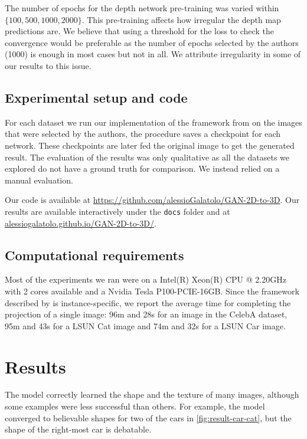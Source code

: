 The number of epochs for the depth network pre-training was varied within $\{100,\allowbreak 500,\allowbreak 1000,\allowbreak 2000\}$. This pre-training affects how irregular the depth map predictions are. We believe that using a threshold for the loss to check the convergence would be preferable as the number of epochs selected by the authors (1000) is enough in most cases but not in all. We attribute irregularity in some of our results to this issue.
\subsection{Experimental setup and code}
For each dataset we run our implementation of the framework from \textcite{gan2shape} on the images that were selected by the authors, the procedure saves a checkpoint for each network. These checkpoints are later fed the original image to get the generated result. The evaluation of the results was only qualitative as all the datasets we explored do not have a ground truth for comparison. We instead relied on a manual evaluation.

Our code is available at \url{https://github.com/alessioGalatolo/GAN-2D-to-3D}. Our results are available interactively under the \lstinline{docs} folder and at \href{https://alessiogalatolo.github.io/GAN-2D-to-3D/}{alessiogalatolo.github.io/GAN-2D-to-3D/}.
\subsection{Computational requirements}
Most of the experiments we ran were on a Intel(R) Xeon(R) CPU @ 2.20GHz with 2 cores available and a Nvidia Tesla P100-PCIE-16GB. Since the framework described by \textcite{gan2shape} is instance-specific, we report the average time for completing the projection of a single image: 96m and 28s for an image in the CelebA dataset, 95m and 43s for a LSUN Cat image and 74m and 32s for a LSUN Car image.
\section{Results}
\label{sec:results}
The model correctly learned the shape and the texture of many images, although some examples were less successful than others. For example, the model converged to believable shapes for two of the cars in \autoref{fig:result-car-cat}, but the shape of the right-most car is debatable. 

